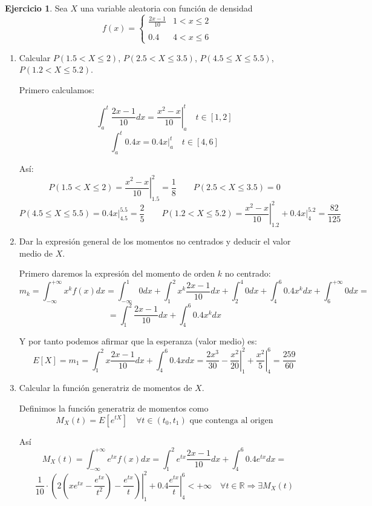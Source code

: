 \documentclass[a4paper, 12pt]{article}
\theoremstyle{definition}
\newtheorem{ej}{Ejercicio}
\begin{document}
\begin{ej}
Sea \(X\) una variable aleatoria con función de densidad
\[
	f(x) = \left\{ \begin{array}{cc}
	\frac{2x-1}{10} & 1 < x \leq 2 \\
	& \\
	0.4 & 4 < x \leq 6
	\end{array} \right.
\]

\begin{enumerate}[label=\textit{\alph*)}]
	\item Calcular \(P(1.5 < X \leq 2)\), \(P(2.5 < X \leq 3.5)\), \(P(4.5 \leq X \leq 5.5)\), \(P(1.2 < X \leq 5.2)\).
	
Primero calculamos:

\[
	\int_{a}^{t} \frac{2x-1}{10}dx = \left. \frac{x^2 - x}{10} \right|_{a}^{t} \quad t \in [1,2]
\]
\[
	\int_{a}^{t} 0.4x = \left. 0.4x \right|_{a}^{t} \quad t \in [4,6]
\]

Así:
\[
	P(1.5 < X \leq 2) = \left. \frac{x^2 - x}{10} \right|_{1.5}^{2} = \frac{1}{8} \qquad P(2.5 < X \leq 3.5) = 0
\]
\[
P(4.5 \leq X \leq 5.5) = \left. 0.4x \right|_{4.5}^{5.5} = \frac{2}{5} \qquad P(1.2 < X \leq 5.2) = \left. \frac{x^2 - x}{10} \right|_{1.2}^{2} + \left. 0.4x \right|_{4}^{5.2} = \frac{82}{125}
\]

	\item Dar la expresión general de los momentos no centrados y deducir el valor medio de \(X\).
	
Primero daremos la expresión del momento de orden \(k\) no centrado:
\[
	m_k = \int_{-\infty}^{+\infty} x^k f(x) dx = \int_{-\infty}^{1} 0 dx + \int_{1}^{2} x^k \frac{2x-1}{10}dx + \int_{2}^{4} 0 dx + \int_{4}^{6} 0.4x^kdx + \int_{6}^{+\infty} 0 dx =
\]
\[
	= \int_{1}^{2} \frac{2x -1 }{10} dx + \int_{4}^{6} 0.4x^k dx
\]

Y por tanto podemos afirmar que la esperanza (valor medio) es:
\[
	E[X] = m_1 = \int_{1}^{2} x \frac{2x-1}{10} dx + \int_{4}^{6} 0.4 x dx = \left. \frac{2x^3}{30} - \frac{x^2}{20} \right|_{1}^{2} + \left. \frac{x^2}{5} \right|_{4}^{6} = \frac{259}{60} 
\]

	\item Calcular la función generatriz de momentos de \(X\).
	
Definimos la función generatriz de momentos como
\[
	M_X(t) = E[e^{tX}] \quad \forall t \in (t_0, t_1) \text{ que contenga al origen}
\]

Así
\[
	M_X(t) = \int_{-\infty}^{+\infty} e^{tx} f(x) dx = \int_{1}^{2} e^{tx} \frac{2x-1}{10} dx + \int_{4}^{6} 0.4e^{tx} dx = 
\]
\[
	\frac{1}{10} \cdot \left. \left( 2 \left( x e^{tx} - \frac{e^{tx}}{t^2} \right) - \frac{e^{tx}}{t} \right) \right|_{1}^{2}  + 0.4 \left. \frac{e^{tx}}{t} \right|_{4}^{6} < + \infty \quad \forall t \in \mathbb{R} \Rightarrow \exists M_X(t)
\]
\end{enumerate}

\end{ej}
\end{document}
